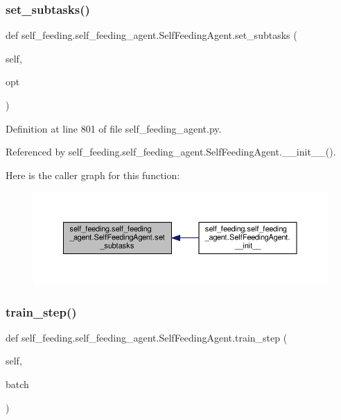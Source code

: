 \subsubsection{\texorpdfstring{set\+\_\+subtasks()}{set\_subtasks()}}
{\footnotesize\ttfamily def self\+\_\+feeding.\+self\+\_\+feeding\+\_\+agent.\+Self\+Feeding\+Agent.\+set\+\_\+subtasks (\begin{DoxyParamCaption}\item[{}]{self,  }\item[{}]{opt }\end{DoxyParamCaption})}



Definition at line 801 of file self\+\_\+feeding\+\_\+agent.\+py.



Referenced by self\+\_\+feeding.\+self\+\_\+feeding\+\_\+agent.\+Self\+Feeding\+Agent.\+\_\+\+\_\+init\+\_\+\+\_\+().

Here is the caller graph for this function\+:
\nopagebreak
\begin{figure}[H]
\begin{center}
\leavevmode
\includegraphics[width=350pt]{classself__feeding_1_1self__feeding__agent_1_1SelfFeedingAgent_ab500915eed5d30c7f2672f9db4ef32cc_icgraph}
\end{center}
\end{figure}
\mbox{\label{classself__feeding_1_1self__feeding__agent_1_1SelfFeedingAgent_a4f04842d386c1747eefba384966687de}} 
\subsubsection{\texorpdfstring{train\+\_\+step()}{train\_step()}}
{\footnotesize\ttfamily def self\+\_\+feeding.\+self\+\_\+feeding\+\_\+agent.\+Self\+Feeding\+Agent.\+train\+\_\+step (\begin{DoxyParamCaption}\item[{}]{self,  }\item[{}]{batch }\end{DoxyParamCaption})}

